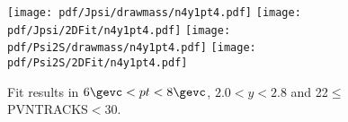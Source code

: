 \begin{figure}[H]
\begin{center}
\texttt{[image: pdf/Jpsi/drawmass/n4y1pt4.pdf]}
\texttt{[image: pdf/Jpsi/2DFit/n4y1pt4.pdf]}
\vspace*{-0.5cm}
\texttt{[image: pdf/Psi2S/drawmass/n4y1pt4.pdf]}
\texttt{[image: pdf/Psi2S/2DFit/n4y1pt4.pdf]}
\vspace*{-0.5cm}
\end{center}
\caption{Fit results in $6\gevc<pt<8\gevc$, $2.0<y<2.8$ and 22$\leq$PVNTRACKS$<$30.}
\label{Fitn4y1pt4}
\end{figure}
